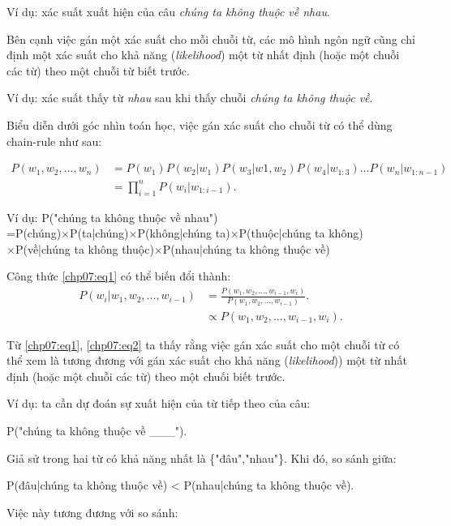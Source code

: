 Ví dụ: xác suất xuất hiện của câu \textit{chúng ta không thuộc về nhau}.

Bên cạnh việc gán một xác suất cho mỗi chuỗi từ, các mô hình ngôn ngữ cũng chỉ định một xác suất cho khả năng (\textit{likelihood}) một từ nhất định (hoặc một chuỗi các từ) theo một chuỗi từ biết trước.

Ví dụ: xác suất thấy từ \textit{nhau} sau khi thấy chuỗi \textit{chúng ta không thuộc về}.

Biểu diễn dưới góc nhìn toán học, việc gán xác suất cho chuỗi từ có thể dùng chain-rule như sau:

\begin{equation}
\label{chp07:eq1}
\begin{split}
P(w_1,w_2,...,w_n)&= P(w_1)P(w_2|w_1)P(w_3|w1,w_2)P(w_4|w_{1:3})...P(w_n|w_{1:n-1})\\
&=\displaystyle\prod_{i=1}^{n} P(w_i|w_{1:i-1}).
\end{split}
\end{equation}

Ví dụ: P("chúng ta không thuộc về nhau")\\
       =P(chúng)$\times$P(ta|chúng)$\times$P(không|chúng ta)$\times$P(thuộc|chúng ta không)\\
       $\times$P(về|chúng ta không thuộc)$\times$P(nhau|chúng ta không thuộc về)

Công thức \ref{chp07:eq1} có thể biến đổi thành:
\begin{equation}
\label{chp07:eq2}
\begin{split}
P(w_i|w_1,w_2,...,w_{i-1})&=\frac{P(w_1,w_2,...,w_{i-1},w_i)}{P(w_1,w_2,...,w_{i-1})}.\\
&\propto P(w_1,w_2,...,w_{i-1},w_i).
\end{split}
\end{equation}

Từ \eqref{chp07:eq1}, \eqref{chp07:eq2} ta thấy rằng việc gán xác suất cho một chuỗi từ có thể xem là tương đương với gán xác suất cho khả năng (\textit{likelihood})) một từ nhất định  (hoặc một chuỗi các từ) theo một chuối biết trước.

Ví dụ: ta cần dự đoán sự xuất hiện của từ tiếp theo của câu:

P("chúng ta không thuộc về \_\_\_").

Giả sử trong hai từ có khả năng nhất là \{"đâu","nhau"\}. Khi đó, so sánh giữa:

P(đâu|chúng ta không thuộc về) < P(nhau|chúng ta không thuộc về).

Việc này tương đương với so sánh:

